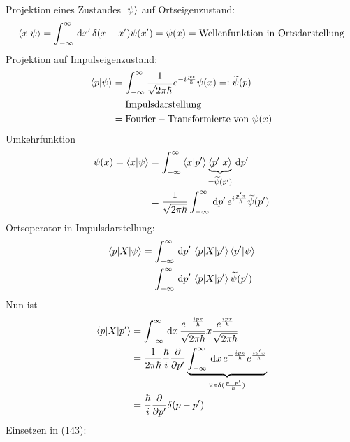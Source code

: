 \documentclass[a4paper]{scrartcl}
\newcommand{\dd}{\ensuremath \, \mathrm{d}}
\begin{document}
{Projektion eines Zustandes $\ket \psi$ auf Ortseigenzustand:
\begin{align}
\braket{ x | \psi} = \int_{-\infty}^\infty \dd x' \, \delta (x - x') \psi(x') = \psi(x) = \mathrm{ Wellenfunktion \ in \ Ortsdarstellung }
\end{align}
Projektion auf Impulseigenzustand:
\begin{align}
\begin{split}
\braket{ p | \psi} & = \int_{-\infty}^\infty \frac1{\sqrt{2\pi\hbar}} e^{-i \frac{px}\hbar} \psi(x) =: \widetilde \psi(p) \\
&  = \mathrm{Impulsdarstellung} \\
& = \mathrm{Fourier-Transformierte \ von \ } \psi(x)
\end{split}
\end{align}
Umkehrfunktion
\begin{align}
\begin{split}
\psi(x) = \braket{ x | \psi } & = \int_{-\infty}^\infty \braket{ x | p'} \underbrace{ \braket{ p' | x}}_{= \widetilde \psi(p')} \dd p' \\
& = \frac1{\sqrt{2 \pi \hbar}} \int_{-\infty}^\infty \dd p' \, e^{i \frac{p'x}\hbar} \widetilde \psi(p')
\end{split}
\end{align}
Ortsoperator in Impulsdarstellung:
\begin{align}
\begin{split}
\braket{ p | X | \psi} & = \int_{-\infty}^\infty \dd p' \, \braket{ p | X | p'}\braket{p' | \psi} \\
& = \int_{-\infty}^\infty \dd p' \, \braket{p | X | p'} \widetilde \psi(p')
\end{split}
\end{align}
Nun ist 
\begin{align}
\begin{split}
\braket{ p | X | p'} & = \int_{-\infty}^\infty \dd x \, \frac{ e^{ - \frac{i p x}\hbar}}{\sqrt{2\pi \hbar}} x \frac{ e^{\frac{ipx}\hbar}}{\sqrt{2 \pi \hbar}} \\
& = \frac1{{2\pi\hbar}} \frac \hbar i \frac \partial {\partial p'} \underbrace{ \int_{-\infty}^\infty \dd x \, e^{-\frac{ipx}\hbar} e^{\frac{ip'x}\hbar}}_{2 \pi \delta(\frac{p - p'}\hbar)} \\
& = \frac \hbar i \frac \partial {\partial p'} \delta(p - p')
\end{split}
\end{align}
Einsetzen in (143):
\begin{align}

\end{align}}
\end{document}
